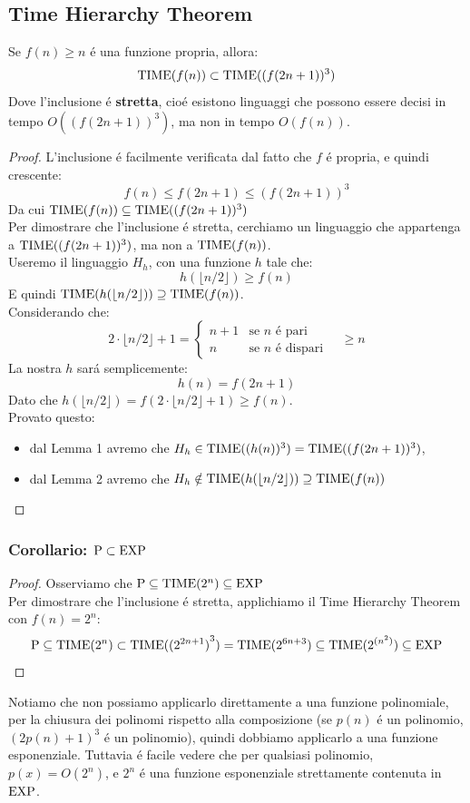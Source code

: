 \subsection{Time Hierarchy Theorem}
Se $f(n) \geq n$ é una funzione propria, allora:
\[\text{TIME}(f(n)) \subset \text{TIME}((f(2n + 1))^3)\]
Dove l'inclusione é \textbf{stretta}, cioé esistono linguaggi che possono essere decisi in tempo $O((f(2n+1))^3)$, ma non in tempo $O(f(n))$.
\begin{proof}
L'inclusione é facilmente verificata dal fatto che $f$ é propria, e quindi crescente: 
\[f(n) \leq f(2n + 1) \leq (f(2n + 1))^3\]
Da cui $\text{TIME}(f(n)) \subseteq \text{TIME}((f(2n+1))^3)$ \\

Per dimostrare che l'inclusione é stretta, cerchiamo un linguaggio che appartenga a $\text{TIME}((f(2n + 1))^3)$, ma non a $\text{TIME}(f(n))$. \\

Useremo il linguaggio $H_h$, con una funzione $h$ tale che:
\[
h(\lfloor n/2 \rfloor) \geq f(n)
\]
E quindi $\text{TIME}(h(\lfloor n/2 \rfloor)) \supseteq \text{TIME}(f(n))$. \\

Considerando che:
\[
2 \cdot \lfloor n/2 \rfloor + 1 =
\begin{cases}
    n + 1 & \text{se $n$ é pari} \\
    n     & \text{se $n$ é dispari}
\end{cases}
\quad \geq n
\]
La nostra $h$ sará semplicemente:
\[h(n) = f(2n + 1)\]
Dato che $h(\lfloor n/2 \rfloor) = f(2 \cdot \lfloor n/2 \rfloor + 1) \geq f(n)$. \\

Provato questo:
\begin{itemize}
    \item dal Lemma 1 avremo che $H_h \in \text{TIME}((h(n))^3) = \text{TIME}((f(2n + 1))^3)$, 
    \item dal Lemma 2 avremo che $H_h \notin \text{TIME}(h(\lfloor n/2 \rfloor)) \supseteq \text{TIME}(f(n))$
\end{itemize}    
\end{proof}

\subsubsection{Corollario: $\text{P} \subset \text{EXP}$}
\begin{proof}
    Osserviamo che $\text{P} \subseteq \text{TIME}(2^n) \subseteq \text{EXP}$ \\
    Per dimostrare che l'inclusione é stretta, applichiamo il Time Hierarchy Theorem con $f(n) = 2^n$:
    \[\text{P} \subseteq \text{TIME}(2^n) \subset \text{TIME}({(2^{2n+1})}^3) = \text{TIME}(2^{6n+3}) \subseteq \text{TIME}(2^{(n^2)}) \subseteq \text{EXP}\]
\end{proof}
Notiamo che non possiamo applicarlo direttamente a una funzione polinomiale, per la chiusura dei polinomi rispetto alla composizione
(se $p(n)$ é un polinomio, $(2p(n) + 1)^3$ é un polinomio), 
quindi dobbiamo applicarlo a una funzione esponenziale.
Tuttavia é facile vedere che per qualsiasi polinomio, $p(x) = O(2^n)$, e $2^n$ é una funzione esponenziale strettamente contenuta in $\text{EXP}$.

